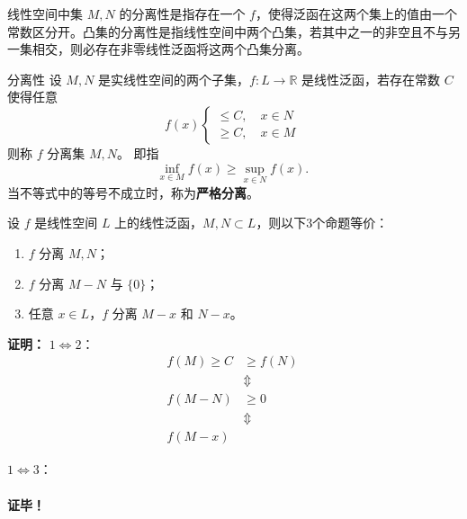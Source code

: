 

线性空间中集 $M,N$ 的分离性是指存在一个 $f$，使得泛函在这两个集上的值由一个常数区分开。凸集的分离性是指线性空间中两个凸集，若其中之一的非空且不与另一集相交，则必存在非零线性泛函将这两个凸集分离。

\begin{definition}{分离性}
设 $M,N$ 是实线性空间的两个子集，$f:L\rightarrow\mathbb R$ 是线性泛函，若存在常数 $C$ 使得任意 
\begin{equation}
f(x)\left\{\begin{aligned}\leq C,\quad x\in N\\
\geq C,\quad x\in M
\end{aligned}\right.~
\end{equation}
则称 $f$ 分离集 $M,N$。
即指
\begin{equation}
\inf_{x\in M}f(x)\geq\sup_{x\in N}f(x).~
\end{equation}
当不等式中的等号不成立时，称为\textbf{严格分离}。
\end{definition}

\begin{theorem}{}
设 $f$ 是线性空间 $L$ 上的线性泛函，$M,N\subset L$，则以下3个命题等价：
\begin{enumerate}
\item $f$ 分离 $M,N$；
\item $f$ 分离 $M-N$ 与 $\{0\}$；
\item 任意 $x\in L$，$f$ 分离 $M-x$ 和 $N-x$。
\end{enumerate}
\end{theorem}
\textbf{证明：}
$1\Leftrightarrow2$：
\begin{equation}
\begin{aligned}
f(M)\geq C&\geq f(N)\\
&\Updownarrow \\
f(M-N)&\geq0\\
&\Updownarrow \\
f(M-x)
\end{aligned}~ 
\end{equation}

$1\Leftrightarrow3$：
\begin{equation}
\begin{aligned}

\end{aligned}
\end{equation}


\textbf{证毕！}



